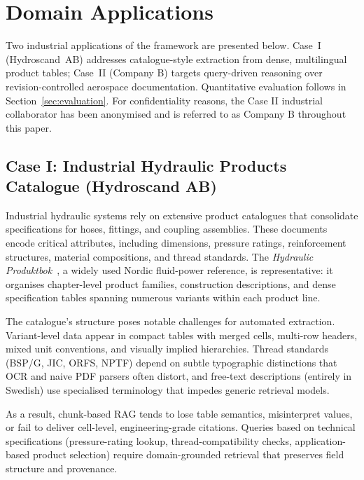 \documentclass[largeformat]{interact}
\begin{document}
\section{Domain Applications}
\label{sec:domain_applications}
Two industrial applications of the framework are presented below. Case~I (Hydroscand~AB) addresses catalogue-style extraction from dense, multilingual product tables; Case~II (Company B) targets query-driven reasoning over revision-controlled aerospace documentation. Quantitative evaluation follows in Section~\ref{sec:evaluation}. For confidentiality reasons, the Case II industrial collaborator has been anonymised and is referred to as Company B throughout this paper.


\subsection{Case I: Industrial Hydraulic Products Catalogue (Hydroscand AB)}
\label{subsec:hydroscand_case}
Industrial hydraulic systems rely on extensive product catalogues that consolidate specifications for hoses, fittings, and coupling assemblies. These documents encode critical attributes, including dimensions, pressure ratings, reinforcement structures, material compositions, and thread standards. The \emph{Hydraulic Produktbok}~\cite{hydroscand2020produktbok}, a widely used Nordic fluid-power reference, is representative: it organises chapter-level product families, construction descriptions, and dense specification tables spanning numerous variants within each product line.

The catalogue's structure poses notable challenges for automated extraction. Variant-level data appear in compact tables with merged cells, multi-row headers, mixed unit conventions, and visually implied hierarchies. Thread standards (BSP/G, JIC, ORFS, NPTF) depend on subtle typographic distinctions that OCR and naive PDF parsers often distort, and free-text descriptions (entirely in Swedish) use specialised terminology that impedes generic retrieval models.

As a result, chunk-based RAG tends to lose table semantics, misinterpret values, or fail to deliver cell-level, engineering-grade citations. Queries based on technical specifications (pressure-rating lookup, thread-compatibility checks, application-based product selection) require domain-grounded retrieval that preserves field structure and provenance.
\end{document}
